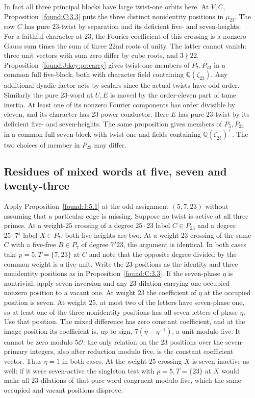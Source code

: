 \documentclass[11pt,a4paper]{article}
\numberwithin{equation}{section}
\theoremstyle{remark}
\newcommand{\QQ}{\mathbb Q}
\begin{document}
In fact all three principal blocks have large twist-one orbits here.
At $V,C$, Proposition~\ref{found:C:3.3} puts the three distinct nonidentity
positions in $\mu_{23}$. The row $C$ has pure $23$-twist by
separation and its deficient five- and seven-heights. For a faithful
character at $23$, the Fourier coefficient of this crossing is a
nonzero Gauss sum times the sum of three $22$nd roots of unity.
The latter cannot vanish: three unit vectors with sum zero differ
by cube roots, and $3\nmid22$. Proposition~\ref{found:J:key:pr:carry} gives
twist-one members of $P_7,P_{23}$ in a common full five-block, both
with character field containing $\QQ(\zeta_{23})$. Any additional
dyadic factor acts by scalars since the actual twists have odd order.
Similarly the pure $23$-word at $U,E$ is moved by the order-eleven
part of tame inertia. At least one of its nonzero Fourier components
has order divisible by eleven, and its character has $23$-power
conductor. Here $E$ has pure $23$-twist by its deficient five- and
seven-heights. The same proposition gives members of $P_5,P_{23}$
in a common full seven-block with twist one and fields containing
$\QQ(\zeta_{23})^+$. The two choices of member in $P_{23}$ may differ.

\subsection{Residues of mixed words at five, seven and twenty-three}\label{sec:odd-mixed-residues}

Apply Proposition~\ref{found:J:5.1} at the odd assignment $(5,7,23)$ without
assuming that a particular edge is missing. Suppose no twist is
active at all three primes. At a weight-$25$ crossing of a degree
$25\cdot 23$ label $C\in P_{23}$ and a degree $25\cdot7^j$
label $X\in P_7$, both five-heights are two. At a weight-$23$
crossing of the same $C$ with a five-free $B\in P_7$ of
degree $7^j23$, the argument is identical. In both cases take
$p=5,T=\{7,23\}$ at $C$ and note that the opposite degree divided
by the common weight is a five-unit. Write the $23$-positions as
the identity and three nonidentity positions as in Proposition~\ref{found:C:3.3}. If the seven-phase $\eta$ is nontrivial,
apply seven-inversion and any $23$-dilation carrying one occupied
nonzero position to a vacant one. At weight $23$ the coefficient
of $\eta$ at the occupied position is seven. At weight $25$,
at most two of the letters have seven-phase one, so at least one of
the three nonidentity positions has all seven letters of phase $\eta$.
Use that position. The mixed difference has zero constant coefficient,
and at the image position its coefficient is, up to sign,
$7(\eta-\eta^{-1})$, a unit modulo five. It cannot be zero modulo
$5\mathcal O$: the only relation on the $23$ positions over the
seven-primary integers, also after reduction modulo five, is the
constant coefficient vector. Thus $\eta=1$ in both cases. At the
weight-$25$ crossing $X$ is seven-inactive as well: if it were
seven-active the singleton test with $p=5,T=\{23\}$ at $X$ would
make all $23$-dilations of that pure word congruent modulo five,
which the same occupied and vacant positions disprove.
\end{document}
